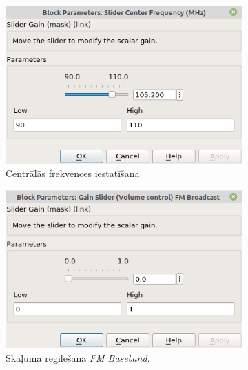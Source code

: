\documentclass[a4paper,12pt]{extarticle}    %
\begin{document}
	\begin{figure}[H] %
	\centering
		\begin{subfigure}[t]{0.45\textwidth}
		\centering
		\includegraphics[trim={0cm 0cm 0cm 0cm},clip, angle=0, width=0.99\linewidth ]{pictures/fmslider.png}
		\caption{Centrālās frekvences iestatīšana}\label{fig:cf}
	\end{subfigure}
	\begin{subfigure}[t]{0.45\textwidth}
		\centering
		\includegraphics[trim={0cm 0cm 0cm 0cm},clip, angle=0, width=0.99\linewidth ]{pictures/gain1.png}
		\caption{Skaļuma regilēšana \textit{FM Baseband}.}\label{fig:volume1}
	\end{subfigure}
	\label{fig:pilseta_modulacija}
	\begin{subfigure}[t]{0.45\textwidth}
		\centering

\end{subfigure}
\end{figure}
\end{document}
